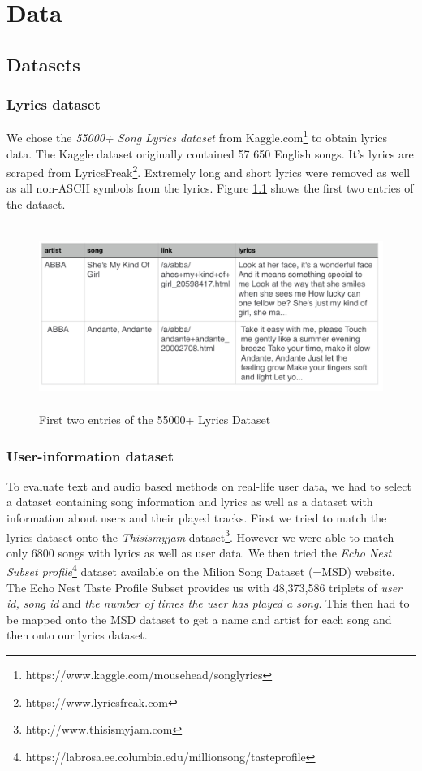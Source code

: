 \chapter{Data}

\section{Datasets}

\subsection{Lyrics dataset}
 We chose the \textit{55000+ Song Lyrics dataset} from
 Kaggle.com\footnote{https://www.kaggle.com/mousehead/songlyrics} to obtain lyrics
 data. The Kaggle dataset originally contained 57 650 English songs. It’s lyrics are
 scraped from LyricsFreak\footnote{https://www.lyricsfreak.com}. Extremely long and short lyrics were removed as well as
 all non-ASCII symbols from the lyrics. Figure \ref{fig:lyrics_dataset} shows the
 first two entries of the dataset.\\
 \begin{figure}[h]
    \centering
	\includegraphics[height=60mm]{./img/dataset_preview.png}
	\caption{First two entries of the 55000+ Lyrics Dataset}
	\label{fig:lyrics_dataset}
\end{figure}

\subsection{User-information dataset}
To evaluate text and audio based methods on real-life user data, we had to select a
dataset containing song information and lyrics as well as a dataset with information
about users and their played tracks. First we tried to match the lyrics dataset onto
the \textit{Thisismyjam} dataset\footnote{http://www.thisismyjam.com}. However we
were able to match only 6800 songs with lyrics as well as user data. We then tried
the \textit{Echo Nest Subset profile}\footnote{https://labrosa.ee.columbia.edu/millionsong/tasteprofile} \cite{Bertin-Mahieux2011} dataset available
on the Milion Song Dataset (=MSD) website. 
The Echo Nest Taste Profile Subset provides us with 48,373,586 triplets of
\textit{user id, song id} and \textit{the number of times the user has played a
song}. This then had to be mapped onto the MSD dataset to get a name and artist for each song and then onto our lyrics dataset.

